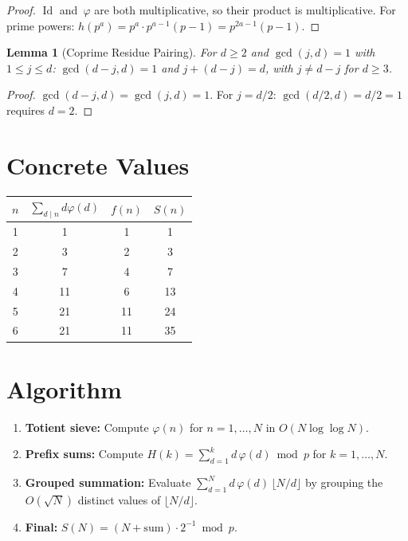 \documentclass[12pt]{article}
\newtheorem{lemma}[theorem]{Lemma}
\begin{document}
\begin{proof}
$\operatorname{Id}$ and~$\varphi$ are both multiplicative, so their product is multiplicative. For prime powers: $h(p^a) = p^a \cdot p^{a-1}(p-1) = p^{2a-1}(p-1)$.
\end{proof}

\begin{lemma}[Coprime Residue Pairing]
For $d \geq 2$ and $\gcd(j,d) = 1$ with $1 \leq j \leq d$: $\gcd(d-j, d) = 1$ and $j + (d-j) = d$, with $j \neq d - j$ for $d \geq 3$.
\end{lemma}

\begin{proof}
$\gcd(d-j, d) = \gcd(j, d) = 1$. For $j = d/2$: $\gcd(d/2, d) = d/2 = 1$ requires $d = 2$.
\end{proof}

\section{Concrete Values}

\begin{center}
\begin{tabular}{cccc}
\toprule
$n$ & $\sum_{d \mid n} d\varphi(d)$ & $f(n)$ & $S(n)$ \\
\midrule
1 & 1  & 1  & 1 \\
2 & 3  & 2  & 3 \\
3 & 7  & 4  & 7 \\
4 & 11 & 6  & 13 \\
5 & 21 & 11 & 24 \\
6 & 21 & 11 & 35 \\
\bottomrule
\end{tabular}
\end{center}

\section{Algorithm}

\begin{enumerate}
\item \textbf{Totient sieve:} Compute $\varphi(n)$ for $n = 1, \ldots, N$ in $O(N \log\log N)$.
\item \textbf{Prefix sums:} Compute $H(k) = \sum_{d=1}^{k} d\,\varphi(d) \bmod p$ for $k = 1, \ldots, N$.
\item \textbf{Grouped summation:} Evaluate $\sum_{d=1}^{N} d\,\varphi(d)\,\lfloor N/d \rfloor$ by grouping the $O(\sqrt{N})$ distinct values of $\lfloor N/d \rfloor$.
\item \textbf{Final:} $S(N) = (N + \text{sum}) \cdot 2^{-1} \bmod p$.
\end{enumerate}
\end{document}
